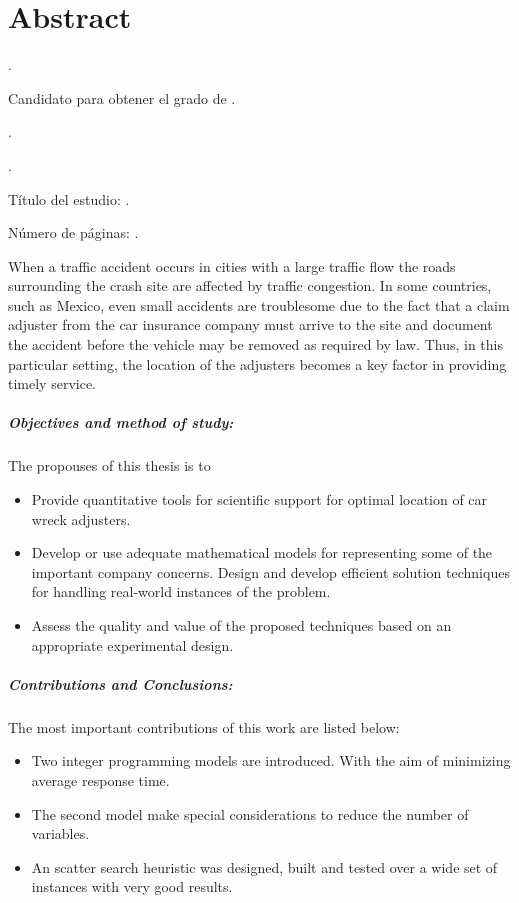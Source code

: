 
\chapter{Abstract}

{\setlength{\leftskip}{10mm}
\setlength{\parindent}{-10mm}

\autor.

Candidato para obtener el grado de \grado\orientacion.

\uanl.

\fime.

Título del estudio: \textsc{\titulo}.

\noindent Número de páginas: \pageref*{lastpage}.}

When a traffic accident occurs
in cities with a large traffic flow
the roads surrounding the crash site
are affected by traffic congestion.
In some countries, such as Mexico,
even small accidents are troublesome
due to the fact
that a claim adjuster
from the car insurance company
must arrive to the site
and document the accident
before the vehicle may be removed
as required by law.
Thus,
in this particular setting,
the location of the adjusters
becomes a key factor in providing timely service.

\paragraph{Objectives and method of study:}
The propouses of this thesis is to
\begin{itemize}
\item Provide quantitative tools
for scientific support
for optimal location
of car wreck adjusters.
\item Develop or use
adequate mathematical models
for representing
some of the important company concerns.
Design and develop efficient solution techniques
for handling real-world instances of the problem.
\item Assess
the quality and value of the proposed techniques
based on an appropriate experimental design.
\end{itemize}

\paragraph{Contributions and Conclusions:}
The most important contributions of this work
are listed below:
\begin{itemize}
\item Two integer programming models
  are introduced.
  With the aim of
  minimizing average response time.
\item The second model
  make special considerations to
  reduce the number of variables.
\item An scatter search heuristic
  was designed, built and tested
  over a wide set of instances
  with very good results.
\end{itemize}

